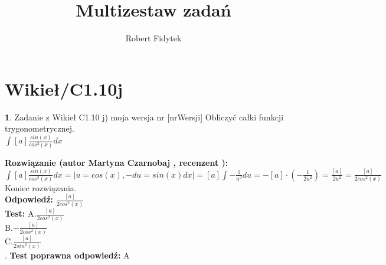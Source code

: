 \documentclass[12pt, a4paper]{article}
\title{Multizestaw zadań}
\author{Robert Fidytek}
\date{}
\theoremstyle{definition} %
\newtheorem{zad}{}
\newcommand{\kategoria}[1]{\section{#1}} %
\newcommand{\zadStart}[1]{\begin{zad}#1\newline} %
\newcommand{\zadStop}{\end{zad}}   %
\newcommand{\rozwStart}[2]{\noindent \textbf{Rozwiązanie (autor #1 , recenzent #2): }\newline} %
\newcommand{\rozwStop}{\newline}                                            %
\newcommand{\odpStart}{\noindent \textbf{Odpowiedź:}\newline}    %
\newcommand{\odpStop}{\newline}                                             %
\newcommand{\testStart}{\noindent \textbf{Test:}\newline} %
\newcommand{\testStop}{\newline} %
\newcommand{\kluczStart}{\noindent \textbf{Test poprawna odpowiedź:}\newline} %
\newcommand{\kluczStop}{\newline} %
\begin{document}
\maketitle


\kategoria{Wikieł/C1.10j}
\zadStart{Zadanie z Wikieł C1.10 j) moja wersja nr [nrWersji]}
Obliczyć całki funkcji trygonometrycznej.\\
$\int [a] \frac{sin(x)}{cos^{3}(x)} dx$\\
\zadStop
\rozwStart{Martyna Czarnobaj}{}
	$\int [a] \frac{sin(x)}{cos^{3}(x)} dx = |u=cos(x), -du = sin(x) dx| = [a] \int -\frac{1}{u^{3}} du = -[a] \cdot (-\frac{1}{2u^{2}}) = \frac{[a]}{2u^{2}} = \frac{[a]}{2cos^{2}(x)}$\\ 


Koniec rozwiązania.\\
\rozwStop
\odpStart
$ \frac{[a]}{2cos^{2}(x)}$\\
\odpStop
\testStart
A.$\frac{[a]}{2cos^{2}(x)}$\\
B.$-\frac{[a]}{2cos^{2}(x)}$\\
C.$\frac{[a]}{2sin^{2}(x)}$\\
.
\testStop
\kluczStart
A
\kluczStop
\end{document}

